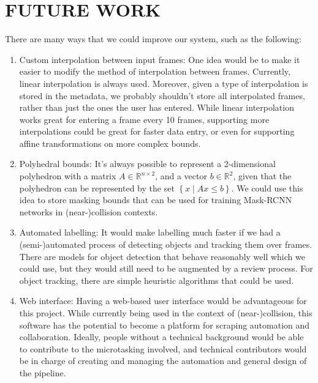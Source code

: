 \documentclass[letterpaper, 10 pt, conference]{IEEEconf}
\newcommand{\todo}[1]{{\color{red}#1}}
\begin{document}

\section{FUTURE WORK}

There are many ways that we could improve our system, such as the following:
\begin{enumerate}
\item Custom interpolation between input frames: One idea would be to make it easier to modify the method of interpolation between frames. Currently, linear interpolation is always used. Moreover, given a type of interpolation is stored in the metadata, we probably shouldn't store all interpolated frames, rather than just the ones the user has entered. While linear interpolation works great for entering a frame every 10 frames, supporting more interpolations could be great for faster data entry, or even for supporting affine transformations on more complex bounds.

\item Polyhedral bounds: It's always possible to represent a 2-dimensional polyhedron with a matrix $A\in\mathbb{R}^{n\times 2}$, and a vector $b\in\mathbb{R}^2$, given that the polyhedron can be represented by the set $\left\{x\mid Ax\leq b\right\}$. We could use this idea to store masking bounds that can be used for training Mask-RCNN networks in (near-)collision contexts. 

\item Automated labelling: It would make labelling much faster if we had a (semi-)automated process of detecting objects and tracking them over frames. There are models for object detection that behave reasonably well which we could use, but they would still need to be augmented by a review process. For object tracking, there are simple heuristic algorithms that could be used. 

\item Web interface: Having a web-based user interface would be advantageous for this project. While currently being used in the context of (near-)collision, this software has the potential to become a platform for scraping automation and collaboration. Ideally, people without a technical background would be able to contribute to the microtasking involved, and technical contributors would be in charge of creating and managing the automation and general design of the pipeline.

\end{enumerate}

\addtolength{\textheight}{-12cm}



\nocite{*}
\printbibliography
\end{document}
